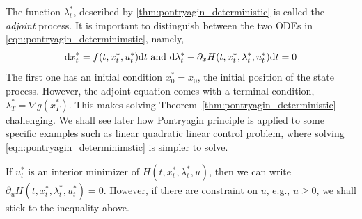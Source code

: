 \documentclass[11pt]{book}
\newcommand{\dd}{\text{\normalfont d}}
\newcommand{\dt}{\text{\normalfont d}t}
\newcommand{\dx}{\text{\normalfont d}x}
\begin{document}
The function $\lambda^*_t$, described by \ref{thm:pontryagin_deterministic} is called the \emph{adjoint} process. It is important to distinguish between the two ODEs in \eqref{eqn:pontryagin_determinimstic}, namely, 
\begin{equation}
    {\dx}^*_t = f(t,x^*_t,u^*_t) {{\dt}} \text{ and }{\dd}\lambda^*_t+ \partial_x H(t,x^*_t,\lambda^*_t,u^*_t){{\dt}}=0
\end{equation}
The first one has an initial condition $x^*_0=x_0$, the initial position of the state process. However, the adjoint equation comes with a terminal condition, $\lambda^*_T=\nabla g(x^*_T)$. This makes solving Theorem~\ref{thm:pontryagin_deterministic} challenging. We shall see later how Pontryagin principle is applied to some specific examples such as linear quadratic linear control problem, where solving \eqref{eqn:pontryagin_determinimstic} is simpler to solve. 
\begin{rem}
If $u^*_t$ is an interior minimizer of $H(t,x^*_t,\lambda^*_t,u)$, then we can write $\partial_u H(t,x^*_t,\lambda^*_t,u^*_t)=0$. However, if there are constraint on $u$, e.g., $u\ge0$, we shall stick to the inequality above. 
\end{rem}
\end{document}
